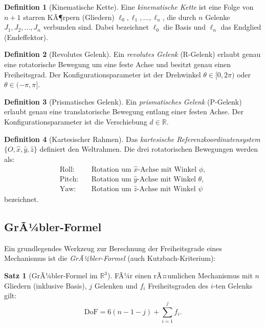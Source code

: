 ﻿\documentclass[a4paper,12pt]{article}
\theoremstyle{definition}
\newtheorem{definition}{Definition}
\newtheorem{satz}{Satz}
\begin{document}
\begin{definition}[Kinematische Kette]
	Eine \emph{kinematische Kette} ist eine Folge von $n+1$ starren KÃ¶rpern (Gliedern) $\ell_0, \ell_1, \ldots, \ell_n$, die durch $n$ Gelenke $J_1, J_2, \ldots, J_n$ verbunden sind. Dabei bezeichnet $\ell_0$ die Basis und $\ell_n$ das Endglied (Endeffektor).
\end{definition}

\begin{definition}[Revolutes Gelenk]
	Ein \emph{revolutes Gelenk} (R-Gelenk) erlaubt genau eine rotatorische Bewegung um eine feste Achse und besitzt genau einen Freiheitsgrad. Der Konfigurationsparameter ist der Drehwinkel $\theta \in [0, 2\pi)$ oder $\theta \in (-\pi, \pi]$.
\end{definition}

\begin{definition}[Prismatisches Gelenk]
	Ein \emph{prismatisches Gelenk} (P-Gelenk) erlaubt genau eine translatorische Bewegung entlang einer festen Achse. Der Konfigurationsparameter ist die Verschiebung $d \in \mathbb{R}$.
\end{definition}

\begin{definition}[Kartesischer Rahmen]
	Das \emph{kartesische Referenzkoordinatensystem} $\{O, \hat{x}, \hat{y}, \hat{z}\}$ definiert den Weltrahmen. Die drei rotatorischen Bewegungen werden als:
	\begin{align*}
		\text{Roll:}  & \quad \text{Rotation um } \hat{x}\text{-Achse mit Winkel } \phi, \\
		\text{Pitch:} & \quad \text{Rotation um } \hat{y}\text{-Achse mit Winkel } \theta, \\
		\text{Yaw:}   & \quad \text{Rotation um } \hat{z}\text{-Achse mit Winkel } \psi
	\end{align*}
	bezeichnet.
\end{definition}

\subsection{GrÃ¼bler-Formel}

Ein grundlegendes Werkzeug zur Berechnung der Freiheitsgrade eines Mechanismus ist die \emph{GrÃ¼bler-Formel} (auch Kutzbach-Kriterium):

\begin{satz}[GrÃ¼bler-Formel im $\mathbb{R}^3$]
\label{satz:gruebler}
	FÃ¼r einen rÃ¤umlichen Mechanismus mit $n$ Gliedern (inklusive Basis), $j$ Gelenken und $f_i$ Freiheitsgraden des $i$-ten Gelenks gilt:
	\[
		\text{DoF} = 6(n - 1 - j) + \sum_{i=1}^{j} f_i.
	\]
\end{satz}
\end{document}
